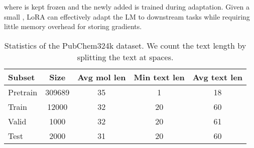 \documentclass[11pt]{article}
\begin{document}
where  is kept frozen and the newly added  is trained during adaptation. Given a small , LoRA can effectively adapt the LM to downstream tasks while requiring little memory overhead for storing gradients. 



%
 \begin{table}[t]
\small
\centering
\setlength{\tabcolsep}{3pt}
\begin{tabular}{lcccc}\toprule
Subset   & Size & Avg mol len & Min text len & Avg text len \\\midrule
Pretrain & 309689               & 35                  & 1               & 18              \\
Train    & 12000                & 32                  & 20              & 60              \\
Valid    & 1000                 & 32                  & 20              & 61              \\
Test     & 2000                 & 31                  & 20              & 60 \\\bottomrule
\end{tabular}
\caption{Statistics of the PubChem324k dataset. We count the text length by splitting the text at spaces.}
\label{tab:statistics}
 \vspace{-4mm}
\end{table}
\end{document}
